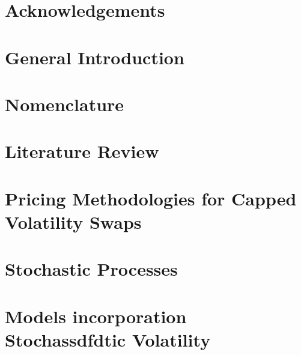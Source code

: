 \documentclass[12pt,a4paper,oneside]{report}
\begin{document}



\setcounter{page}{0}

\chapter*{Acknowledgements}

\newpage

\tableofcontents
\newpage

\setcounter{page}{0}

\chapter*{General Introduction}

\newpage

\chapter*{Nomenclature}


\chapter{Literature Review}




\chapter{Pricing Methodologies for Capped Volatility Swaps}






\chapter{Stochastic Processes}





\chapter{Models incorporation Stochassdfdtic Volatility}




\end{document}
